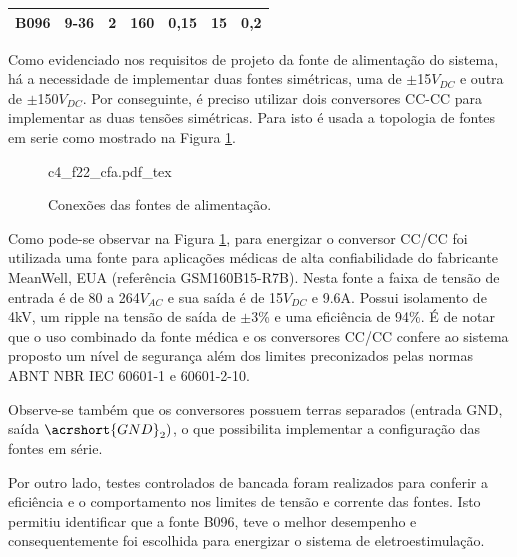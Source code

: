 \begin{table}
\begin{tabular}{|l|l|l|l|l|l|l|}
    B096                                                   & 9-36                                                         & 2                                                      & 160                                                          & 0,15                                                   & 15                                                           & 0,2                                                    \\ \hline
    \end{tabular}
    \label{tab:fla6}
\end{table}

\newpage
Como evidenciado nos requisitos de projeto da fonte de alimentação do sistema, há a necessidade de implementar duas fontes simétricas, uma de $\mathrm{\pm}$15$V_{DC}$ e outra de $\mathrm{\pm}$150$V_{DC}$. Por conseguinte, é preciso utilizar dois conversores CC-CC para implementar as duas tensões simétricas. Para isto é usada a topologia de fontes em serie como mostrado na Figura \ref{fig:c4_f22_cfa}.

\begin{figure}[h]
    \centering %
    \footnotesize %
    \def\svgwidth{0.6\columnwidth}%
    {c4_f22_cfa.pdf_tex}
    \caption{Conexões das fontes de alimentação.}
    \label{fig:c4_f22_cfa}
\end{figure}

Como pode-se observar na Figura \ref{fig:c4_f22_cfa}, para energizar o conversor CC/CC foi utilizada uma fonte para aplicações médicas de alta confiabilidade do fabricante MeanWell, EUA (referência GSM160B15-R7B). Nesta fonte a faixa de tensão de entrada é de 80 a 264$V_{AC}$ e sua saída é de 15$V_{DC}$ e 9.6A. Possui isolamento de 4kV, um ripple na tensão de saída de $\mathrm{\pm}$3\% e uma eficiência de 94\%. É de notar que o uso combinado da fonte médica e os conversores CC/CC confere ao sistema proposto um nível de segurança além dos limites preconizados pelas normas \acrshort{ABNT} \acrshort{NBR} \acrshort{IEC} 60601-1 e 60601-2-10.

Observe-se também que os conversores possuem terras separados (entrada \acrshort{GND}, saída $\acrshort{GND}_2)$, o que possibilita implementar a configuração das fontes em série. 

Por outro lado, testes controlados de bancada foram realizados para conferir a eficiência e o comportamento nos limites de tensão e corrente das fontes. Isto permitiu identificar que a fonte B096, teve o melhor desempenho e consequentemente foi escolhida para energizar o sistema de eletroestimulação.

